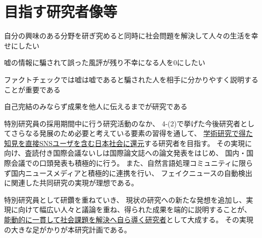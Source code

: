 
\section{目指す研究者像等}

\noindent
{}

自分の興味のある分野を研ぎ究めると同時に社会問題を解決して人々の生活を幸せにしたい

嘘の情報に騙されて誤った風評が残り不幸になる人を0にしたい

ファクトチェックでは嘘は嘘であると騙された人を相手に分かりやすく説明することが重要である

自己完結のみならず成果を他人に伝えるまでが研究である


\vspace{5mm}
\noindent
{}

特別研究員の採用期間中に行う研究活動のなか、
4-(2)で挙げた今後研究者としてさらなる発展のため必要と考えている要素の習得を通して、
\underline{学術研究で得た知見を直接SNSユーザを含む日本社会に還元}する研究者を目指す。
その実現に向け、査読付き国際会議ないしは国際論文誌への論文発表をはじめ、
国内・国際会議での口頭発表も積極的に行う。
また、自然言語処理コミュニティに限らず国内ニュースメディアと積極的に連携を行い、
フェイクニュースの自動検出に関連した共同研究の実現が理想である。

特別研究員として研鑽を重ねていき、
現状の研究への新たな発想を追加し、実現に向けて幅広い人々と議論を重ね、得られた成果を端的に説明することが、
\underline{能動的に一貫して社会課題を解決へ自ら導く研究者}として大成する。
その実現の大きな足がかりが本研究計画である。



